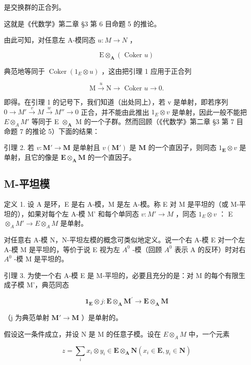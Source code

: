 是交换群的正合列。

这就是《代数学》第二章 §3 第 6 目命题 5 的推论。

由此可知，对任意左 A-模同态 \(u: M \rightarrow N\) ，

\[
\mathrm{E} \otimes_ {\mathbf {A}} (\text { Coker } u)
\]

典范地等同于 \(\operatorname{Coker}(1_{E} \otimes u)\) ，这由把引理 1 应用于正合列

\[
\mathrm{M} \xrightarrow {u} \mathrm{N} \longrightarrow \text { Coker } u \longrightarrow 0.
\]

即得。在引理 1 的记号下，我们知道（出处同上），若 v 是单射，即若序列 \(0 \rightarrow M' \stackrel{v}{\rightarrow} M \stackrel{w}{\rightarrow} M'' \rightarrow 0\) 正合，并不能由此推出 \(1_{E} \otimes v\) 是单射，因此一般不能把 \(E \otimes_{A} M'\) 等同于 E \(\otimes_{\mathbf{A}}\) M 的一个子群。然而回顾（《代数学》第二章 §3 第 7 目命题 7 的推论 5）下面的结果：

引理 2. 若 \(v: \mathbf{M}' \to \mathbf{M}\) 是单射且 \(v(\mathbf{M}')\) 是 \(\mathbf{M}\) 的一个直因子，则同态 \(1_{\mathbf{E}} \otimes v\) 是单射，且它的像是 \(\mathbf{E} \otimes_{\mathbf{A}} \mathbf{M}\) 的一个直因子。

\subsection{M-平坦模}

定义 1. 设 A 是环，E 是右 A-模，M 是左 A-模。称 E 对 M 是平坦的（或 M-平坦的），如果对每个左 A-模 M' 和每个单同态 \(v: M' \to M\) ，同态 \(1_{E} \otimes v\) ： E \(\otimes_{A} M' \to E \otimes_{A} M\) 是单射。

对任意右 A-模 N，N-平坦左模的概念可类似地定义。说一个右 A-模 E 对一个左 A-模 M 是平坦的，等价于说 E 视为左 \(A^{0}\) -模（回顾 \(A^{0}\) 表示 A 的反环）时对右 \(A^{0}\) -模 M 是平坦的。

引理 3. 为使一个右 A-模 E 是 M-平坦的，必要且充分的是：对 M 的每个有限生成子模 M'，典范同态

\[
\mathbf {1} _ {\mathbf {E}} \otimes j: \mathbf {E} \otimes_ {\mathbf {A}} \mathbf {M} ^ {\prime} \rightarrow \mathbf {E} \otimes_ {\mathbf {A}} \mathbf {M}
\]

（j 为典范单射 \(\mathbf{M}'\to \mathbf{M}\) ）是单射的。

假设这一条件成立，并设 N 是 M 的任意子模。设在 \(E \otimes_{A} M\) 中，一个元素

\[
z = \sum_ {i} x _ {i} \otimes y _ {i} \in \mathbf {E} \otimes_ {\mathbf {A}} \mathbf {N} (x _ {i} \in \mathbf {E}, y _ {i} \in \mathbf {N})
\]

